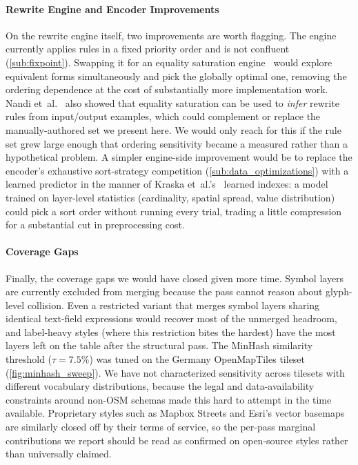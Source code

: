 \paragraph{Rewrite Engine and Encoder Improvements}
On the rewrite engine itself, two improvements are worth flagging.
The engine currently applies rules in a fixed priority order and is not confluent (\cref{sub:fixpoint}).
Swapping it for an equality saturation engine~\cite{tateEqualitySaturationNew2009,willseyEggFastExtensible2021} would explore equivalent forms simultaneously and pick the globally optimal one, removing the ordering dependence at the cost of substantially more implementation work.
Nandi et~al.~\cite{nandiRewriteRuleInference2021} also showed that equality saturation can be used to \emph{infer} rewrite rules from input/output examples, which could complement or replace the manually-authored set we present here.
We would only reach for this if the rule set grew large enough that ordering sensitivity became a measured rather than a hypothetical problem.
A simpler engine-side improvement would be to replace the encoder's exhaustive sort-strategy competition (\cref{sub:data_optimizations}) with a learned predictor in the manner of Kraska et~al.'s~\cite{kraskaCaseLearnedIndex2018} learned indexes: a model trained on layer-level statistics (cardinality, spatial spread, value distribution) could pick a sort order without running every trial, trading a little compression for a substantial cut in preprocessing cost.

\paragraph{Coverage Gaps}
Finally, the coverage gaps we would have closed given more time.
Symbol layers are currently excluded from merging because the pass cannot reason about glyph-level collision.
Even a restricted variant that merges symbol layers sharing identical text-field expressions would recover most of the unmerged headroom, and label-heavy styles (where this restriction bites the hardest) have the most layers left on the table after the structural pass.
The MinHash similarity threshold ($\tau = 7.5\%$) was tuned on the Germany OpenMapTiles tileset (\cref{fig:minhash_sweep}).
We have not characterized sensitivity across tilesets with different vocabulary distributions, because the legal and data-availability constraints around non-\ac{OSM} schemas made this hard to attempt in the time available.
Proprietary styles such as Mapbox Streets and Esri's vector basemaps are similarly closed off by their terms of service, so the per-pass marginal contributions we report should be read as confirmed on open-source styles rather than universally claimed.
